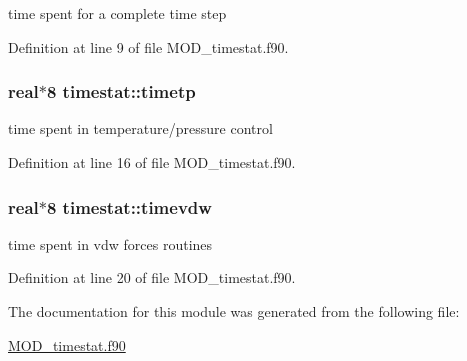 time spent for a complete time step 



Definition at line 9 of file M\-O\-D\-\_\-timestat.\-f90.

\hypertarget{classtimestat_a0a3587a62bcc9c03959a5b90642c3fc6}{
\subsubsection[{timetp}]{\setlength{\rightskip}{0pt plus 5cm}real$\ast$8 timestat\-::timetp}}\label{classtimestat_a0a3587a62bcc9c03959a5b90642c3fc6}


time spent in temperature/pressure control 



Definition at line 16 of file M\-O\-D\-\_\-timestat.\-f90.

\hypertarget{classtimestat_a78ecc1df67b0a241c4dd8885dc25b6d2}{
\subsubsection[{timevdw}]{\setlength{\rightskip}{0pt plus 5cm}real$\ast$8 timestat\-::timevdw}}\label{classtimestat_a78ecc1df67b0a241c4dd8885dc25b6d2}


time spent in vdw forces routines 



Definition at line 20 of file M\-O\-D\-\_\-timestat.\-f90.



The documentation for this module was generated from the following file\-:\begin{DoxyCompactItemize}
\item 
\hyperlink{MOD__timestat_8f90}{M\-O\-D\-\_\-timestat.\-f90}\end{DoxyCompactItemize}
